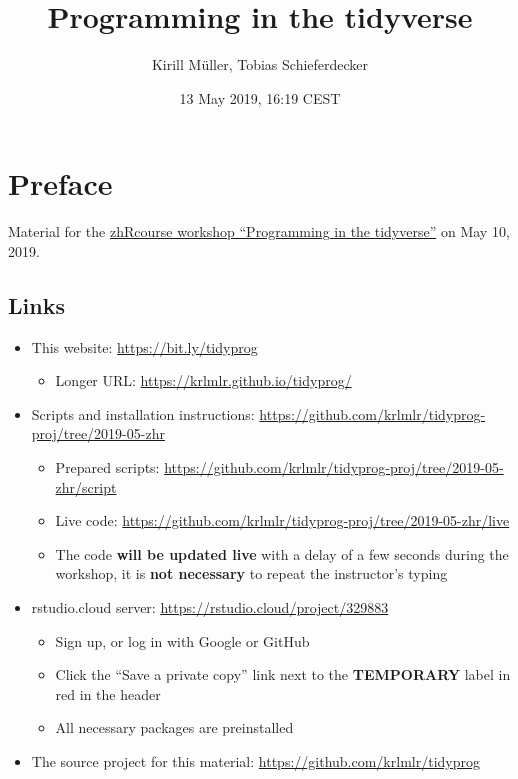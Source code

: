 \documentclass[]{book}
\title{Programming in the tidyverse}
\author{Kirill Müller, Tobias Schieferdecker}
\date{13 May 2019, 16:19 CEST}
\providecommand{\tightlist}{%
  \setlength{\itemsep}{0pt}\setlength{\parskip}{0pt}}
\begin{document}
\maketitle

{
\setcounter{tocdepth}{1}
\tableofcontents
}
\hypertarget{preface}{%
\chapter*{Preface}\label{preface}}

Material for the \href{https://www.zhrcourses.uzh.ch/en/programm2019/tidyverse.html}{zhRcourse workshop ``Programming in the tidyverse''} on May 10, 2019.

\hypertarget{links}{%
\section*{Links}\label{links}}

\begin{itemize}
\tightlist
\item
  This website: \url{https://bit.ly/tidyprog}

  \begin{itemize}
  \tightlist
  \item
    Longer URL: \url{https://krlmlr.github.io/tidyprog/}
  \end{itemize}
\item
  Scripts and installation instructions: \url{https://github.com/krlmlr/tidyprog-proj/tree/2019-05-zhr}

  \begin{itemize}
  \tightlist
  \item
    Prepared scripts: \url{https://github.com/krlmlr/tidyprog-proj/tree/2019-05-zhr/script}
  \item
    Live code: \url{https://github.com/krlmlr/tidyprog-proj/tree/2019-05-zhr/live}
  \item
    The code \textbf{will be updated live} with a delay of a few seconds during the workshop, it is \textbf{not necessary} to repeat the instructor's typing
  \end{itemize}
\item
  rstudio.cloud server: \url{https://rstudio.cloud/project/329883}

  \begin{itemize}
  \tightlist
  \item
    Sign up, or log in with Google or GitHub
  \item
    Click the ``Save a private copy'' link next to the \textbf{TEMPORARY} label in red in the header
  \item
    All necessary packages are preinstalled
  \end{itemize}
\item
  The source project for this material: \url{https://github.com/krlmlr/tidyprog}
\end{itemize}
\end{document}
